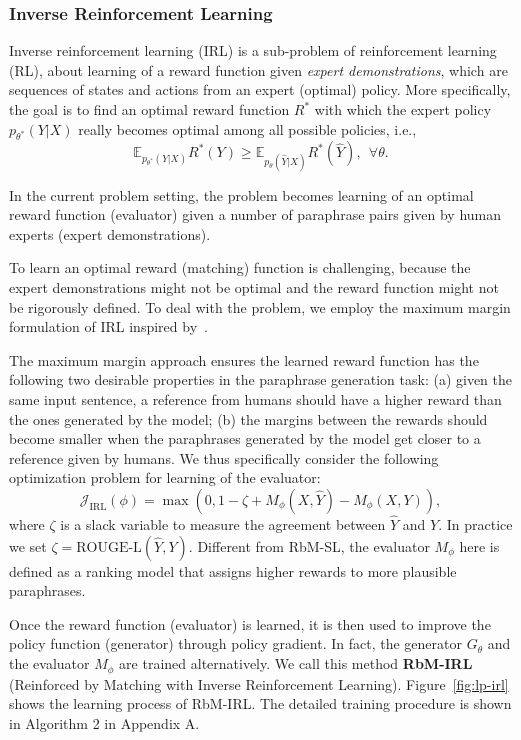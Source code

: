 \documentclass[11pt,a4paper]{article}
\newcommand{\MP}{M_{\phi}}
\newcommand{\GT}{G_{\theta}}
\begin{document}
    \subsubsection*{Inverse Reinforcement Learning}
    Inverse reinforcement learning (IRL) is a sub-problem of reinforcement learning (RL), about learning of a reward function given \textit{expert demonstrations}, which are sequences of states and actions from an expert (optimal) policy. More specifically, the goal is to find an optimal reward function $R^*$ with which the expert policy $p_{\theta^*}(Y|X)$ really becomes optimal among all possible policies, i.e.,
        \[
          \mathbb{E}_{p_{\theta^*}(Y|X)} R^*(Y) \geq \mathbb{E}_{p_{\theta}(\hat{Y}|X)} R^*(\hat{Y}), \ \ \forall \theta.
        \]

    In the current problem setting, the problem becomes learning of an optimal reward function (evaluator) given a number of paraphrase pairs given by human experts (expert demonstrations).

    To learn an optimal reward (matching) function is challenging, because the expert demonstrations might not be optimal and the reward function might not be rigorously defined. To deal with the problem, we employ the maximum margin formulation of IRL inspired by~\citet{ratliff2006maximum}.

   The maximum margin approach ensures the learned reward function has the following two desirable properties in the paraphrase generation task: (a) given the same input sentence, a reference from humans should have a higher reward than the ones generated by the model; (b) the margins between the rewards should become smaller when the paraphrases generated by the model get closer to a reference given by humans. We thus specifically consider the following optimization problem for learning of the evaluator:
        \begin{equation}
            \mathcal{J}_{\text{IRL}}(\phi) = \max (0, 1  - \zeta + M_{\phi}(X, \hat{Y}) - M_{\phi}(X, Y)), \label{eqn:max-margin-irl}
        \end{equation}
    where $\zeta$ is a slack variable to measure the agreement between $\hat{Y}$ and $Y$. In practice we set $\zeta = \text{ROUGE-L}(\hat{Y}, Y)$. Different from RbM-SL, the evaluator $\MP$ here is defined as a ranking model that assigns higher rewards to more plausible paraphrases.

    Once the reward function (evaluator) is learned, it is then used to improve the policy function (generator) through policy gradient.
    In fact, the generator $\GT$ and the evaluator $\MP$ are trained alternatively. We call this method \textbf{RbM-IRL} (Reinforced by Matching with Inverse Reinforcement Learning).
    Figure~\ref{fig:lp-irl} shows the learning process of RbM-IRL. The detailed training procedure is shown in Algorithm 2 in Appendix A.
\end{document}
